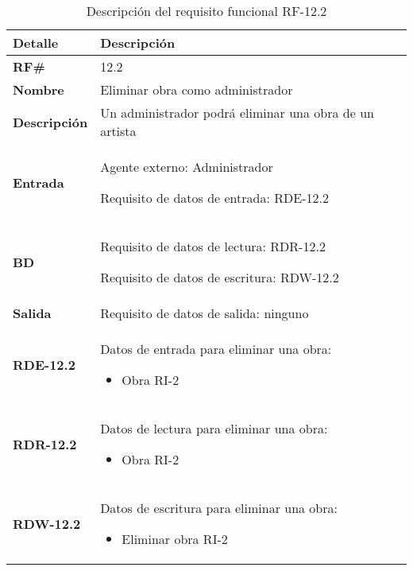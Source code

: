 \begin{table}[H]
    \centering
    \begin{tabular}{|p{3cm}|p{8cm}|}
        \hline
        \rowcolor{lightgray}
        \textbf{Detalle} & \textbf{Descripción} \\
        \hline
        \textbf{RF\#} & 12.2 \\
        \hline
        \textbf{Nombre} & Eliminar obra como administrador \\
        \hline
        \textbf{Descripción} & Un administrador podrá eliminar una obra de un artista \\
        \hline
        \textbf{Entrada} &
        Agente externo: Administrador

        Requisito de datos de entrada: RDE-12.2 \\
        \hline
        \textbf{BD} &
        Requisito de datos de lectura: RDR-12.2

        Requisito de datos de escritura: RDW-12.2 \\
        \hline
        \textbf{Salida} & Requisito de datos de salida: ninguno \\
        \hline
        \textbf{RDE-12.2} & Datos de entrada para eliminar una obra:
            \begin{itemize}
                \item Obra RI-2
            \end{itemize} \\
        \hline
        \textbf{RDR-12.2} & Datos de lectura para eliminar una obra:
            \begin{itemize}
                \item Obra RI-2
            \end{itemize} \\
        \hline
        \textbf{RDW-12.2} & Datos de escritura para eliminar una obra:
            \begin{itemize}
                \item Eliminar obra RI-2
            \end{itemize} \\
        \hline
    \end{tabular}
    \caption{Descripción del requisito funcional RF-12.2}
    \label{tab:rf-12-2}
\end{table}

